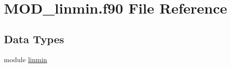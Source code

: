 \hypertarget{MOD__linmin_8f90}{\section{M\-O\-D\-\_\-linmin.\-f90 File Reference}
\label{MOD__linmin_8f90}
}
\subsection*{Data Types}
\begin{DoxyCompactItemize}
\item 
module \hyperlink{classlinmin}{linmin}
\end{DoxyCompactItemize}
